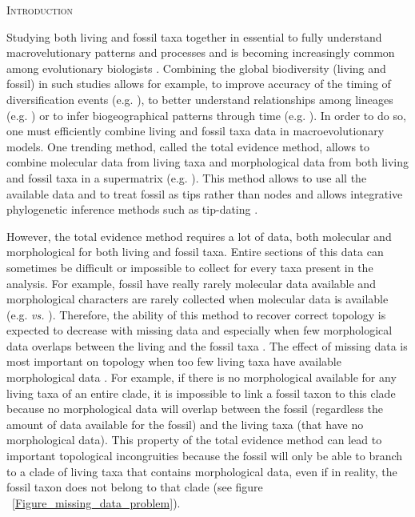 \documentclass[12pt,letterpaper]{article}
\renewcommand{\section}[1]{%
\bigskip
\begin{center}
\begin{Large}
\normalfont\scshape #1
\medskip
\end{Large}
\end{center}}
\begin{document}
\section{Introduction}
Studying both living and fossil taxa together in essential to fully understand macrovelutionary patterns and processes and is becoming increasingly common among evolutionary biologists \cite{jacksonwhat2006,quentaldiversity2010,dietlconservation2011,slaterunifying2013,fritzdiversity2013}. Combining the global biodiversity (living and fossil) in such studies allows for example, to improve accuracy of the timing of diversification events (e.g. \cite{ronquista2012}), to better understand relationships among lineages (e.g. \cite{beckancient2014}) or to infer biogeographical patterns through time (e.g. \cite{Meseguer01032015}).
In order to do so, one must efficiently combine living and fossil taxa data in macroevolutionary models. One trending method, called the total evidence method, allows to combine molecular data from living taxa and morphological data from both living and fossil taxa in a supermatrix (e.g. \cite{pyrondivergence2011,ronquista2012,schragocombining2013,slaterunifying2013,beckancient2014,Meseguer01032015}). This method allows to use all the available data and to treat fossil as tips rather than nodes and allows integrative phylogenetic inference methods such as tip-dating \cite{ronquista2012,Drummond01082012,BEASTmaster}.

However, the total evidence method requires a lot of data, both molecular and morphological for both living and fossil taxa. Entire sections of this data can sometimes be difficult or impossible to collect for every taxa present in the analysis. For example, fossil have really rarely molecular data available and morphological characters are rarely collected when molecular data is available (e.g. \cite{O'Leary08022013} \textit{vs.} \cite{meredithimpacts2011}). Therefore, the ability of this method to recover correct topology is expected to decrease with missing data and especially when few morphological data overlaps between the living and the fossil taxa \cite{GuillermeCooper}. %
The effect of missing data is most important on topology when too few living taxa have available morphological data \cite{GuillermeCooper}.
For example, if there is no morphological available for any living taxa of an entire clade, it is impossible to link a fossil taxon to this clade because no morphological data will overlap between the fossil (regardless the amount of data available for the fossil) and the living taxa (that have no morphological data). This property of the total evidence method can lead to important topological incongruities because the fossil will only be able to branch to a clade of living taxa that contains morphological data, even if in reality, the fossil taxon does not belong to that clade (see figure ~\ref{Figure_missing_data_problem}).
\end{document}
